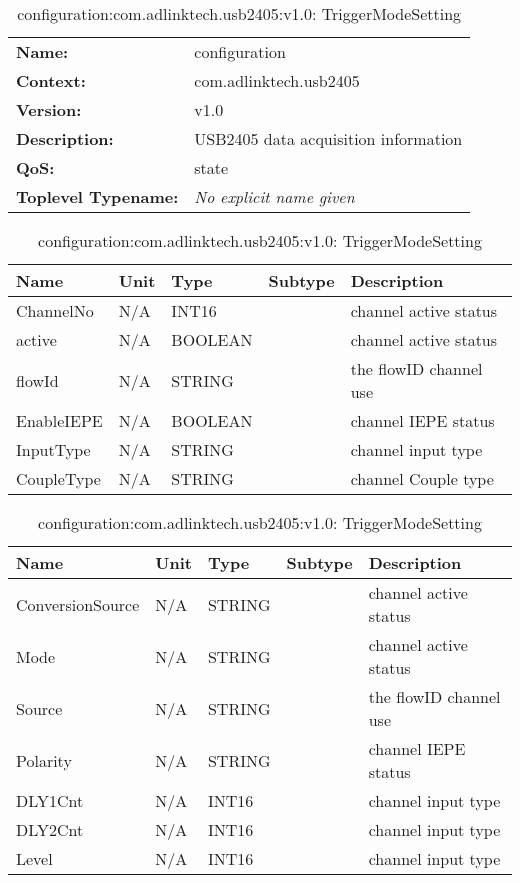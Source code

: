 \begin{table}[H]
\begin{tabularx}{\textwidth}{l X} 
       \textbf{Name:} & configuration \\ 
	   \textbf{Context:} & com.adlinktech.usb2405 \\ 
	   \textbf{Version:} & v1.0 \\ 
	   \textbf{Description:} & USB2405 data acquisition information \\ 
	   \textbf{QoS:} & state \\
	   \textbf{Toplevel Typename:} & \textit{No explicit name given} \\ 
\end{tabularx}
\caption{configuration:com.adlinktech.usb2405:v1.0}\label{DAQStateTagGroup.json:table:configuration}
\bigskip
\begin{tabularx}{\textwidth}{l l l l X} 
	 \textbf{Name} & \textbf{Unit} & \textbf{Type} & \textbf{Subtype} & \textbf{Description} \\
	 \midrule
   ChannelNo & N/A & INT16 &  & channel active status \\
   active & N/A & BOOLEAN &  & channel active status \\
   flowId & N/A & STRING &  & the flowID channel use \\
   EnableIEPE & N/A & BOOLEAN &  & channel IEPE status \\
   InputType & N/A & STRING &  & channel input type \\
   CoupleType & N/A & STRING &  & channel Couple type \\
\end{tabularx}
\caption{configuration:com.adlinktech.usb2405:v1.0: ChannelStatus}\label{DAQStateTagGroup.json:table:configuration-ChannelStatus}

\bigskip
\begin{tabularx}{\textwidth}{l l l l X} 
	 \textbf{Name} & \textbf{Unit} & \textbf{Type} & \textbf{Subtype} & \textbf{Description} \\
	 \midrule
   ConversionSource & N/A & STRING &  & channel active status \\
   Mode & N/A & STRING &  & channel active status \\
   Source & N/A & STRING &  & the flowID channel use \\
   Polarity & N/A & STRING &  & channel IEPE status \\
   DLY1Cnt & N/A & INT16 &  & channel input type \\
   DLY2Cnt & N/A & INT16 &  & channel input type \\
   Level & N/A & INT16 &  & channel input type \\
\end{tabularx}
\caption{configuration:com.adlinktech.usb2405:v1.0: TriggerModeSetting}\label{DAQStateTagGroup.json:table:configuration-TriggerModeSetting}


\end{table}
